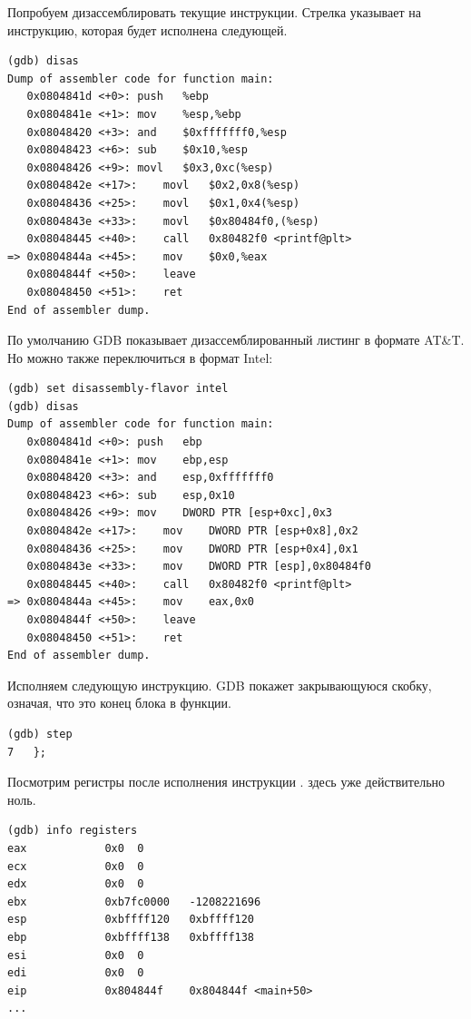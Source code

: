 Попробуем дизассемблировать текущие инструкции.
Стрелка указывает на инструкцию, которая будет исполнена следующей.

\begin{lstlisting}
(gdb) disas
Dump of assembler code for function main:
   0x0804841d <+0>:	push   %ebp
   0x0804841e <+1>:	mov    %esp,%ebp
   0x08048420 <+3>:	and    $0xfffffff0,%esp
   0x08048423 <+6>:	sub    $0x10,%esp
   0x08048426 <+9>:	movl   $0x3,0xc(%esp)
   0x0804842e <+17>:	movl   $0x2,0x8(%esp)
   0x08048436 <+25>:	movl   $0x1,0x4(%esp)
   0x0804843e <+33>:	movl   $0x80484f0,(%esp)
   0x08048445 <+40>:	call   0x80482f0 <printf@plt>
=> 0x0804844a <+45>:	mov    $0x0,%eax
   0x0804844f <+50>:	leave  
   0x08048450 <+51>:	ret    
End of assembler dump.
\end{lstlisting}

По умолчанию \ac{GDB} показывает дизассемблированный листинг в формате AT\&T.
Но можно также переключиться в формат Intel:

\begin{lstlisting}
(gdb) set disassembly-flavor intel
(gdb) disas
Dump of assembler code for function main:
   0x0804841d <+0>:	push   ebp
   0x0804841e <+1>:	mov    ebp,esp
   0x08048420 <+3>:	and    esp,0xfffffff0
   0x08048423 <+6>:	sub    esp,0x10
   0x08048426 <+9>:	mov    DWORD PTR [esp+0xc],0x3
   0x0804842e <+17>:	mov    DWORD PTR [esp+0x8],0x2
   0x08048436 <+25>:	mov    DWORD PTR [esp+0x4],0x1
   0x0804843e <+33>:	mov    DWORD PTR [esp],0x80484f0
   0x08048445 <+40>:	call   0x80482f0 <printf@plt>
=> 0x0804844a <+45>:	mov    eax,0x0
   0x0804844f <+50>:	leave  
   0x08048450 <+51>:	ret    
End of assembler dump.
\end{lstlisting}

Исполняем следующую инструкцию.
\ac{GDB} покажет закрывающуюся скобку, означая, что это конец блока в функции.

\begin{lstlisting}
(gdb) step
7	};
\end{lstlisting}

Посмотрим регистры после исполнения инструкции .
\EAX здесь уже действительно ноль.

\begin{lstlisting}
(gdb) info registers
eax            0x0	0
ecx            0x0	0
edx            0x0	0
ebx            0xb7fc0000	-1208221696
esp            0xbffff120	0xbffff120
ebp            0xbffff138	0xbffff138
esi            0x0	0
edi            0x0	0
eip            0x804844f	0x804844f <main+50>
...
\end{lstlisting}
